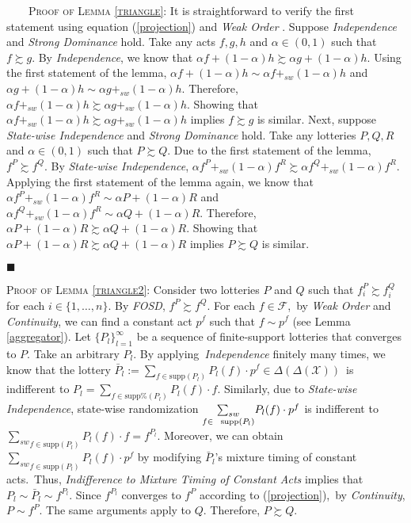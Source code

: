 \documentclass[12pt, notitlepage]{article}
\begin{document}
{~~~~\textsc{Proof of Lemma \ref{triangle}}: It is straightforward to verify
the first statement using equation (\ref{projection}) and \textit{Weak Order}%
. Suppose \textit{Independence} and \textit{Strong Dominance} hold. Take any
acts $f,g,h$ and $\alpha \in (0,1)$ such that $f\succsim g$. By \textit{%
Independence}, we know that $\alpha f+(1-\alpha )h\succsim \alpha
g+(1-\alpha )h$. Using the first statement of the lemma, $\alpha f+(1-\alpha
)h\sim \alpha f+_{sw}(1-\alpha )h$ and $\alpha g+(1-\alpha )h\sim \alpha
g+_{sw}(1-\alpha )h$. Therefore, $\alpha f+_{sw}(1-\alpha )h\succsim \alpha
g+_{sw}(1-\alpha )h$. Showing that $\alpha f+_{sw}(1-\alpha )h\succsim
\alpha g+_{sw}(1-\alpha )h$ implies $f\succsim g$ is similar. Next, suppose 
\textit{State-wise Independence} and \textit{Strong Dominance} hold. Take
any lotteries $P,Q,R$ and $\alpha \in (0,1)$ such that $P\succsim Q$. Due to
the first statement of the lemma, $f^{P}\succsim f^{Q}$. By \textit{%
State-wise Independence}, $\alpha f^{P}+_{sw}(1-\alpha )f^{R}\succsim \alpha
f^{Q}+_{sw}(1-\alpha )f^{R}$. Applying the first statement of the lemma
again, we know that $\alpha f^{P}+_{sw}(1-\alpha )f^{R}\sim \alpha
P+(1-\alpha )R$ and $\alpha f^{Q}+_{sw}(1-\alpha )f^{R}\sim \alpha
Q+(1-\alpha )R$. Therefore, $\alpha P+(1-\alpha )R\succsim \alpha
Q+(1-\alpha )R$. Showing that $\alpha P+(1-\alpha )R\succsim \alpha
Q+(1-\alpha )R$ implies $P\succsim Q$ is similar.}

\begin{flushleft}
{$\blacksquare $\linebreak }
\end{flushleft}

{\textsc{Proof of Lemma \ref{triangle2}}: Consider two lotteries $P$ and $Q$
such that $f_{i}^{P}\succsim f_{i}^{Q}$ for each $i\in \{1,\dots ,n\}$. By 
\textit{FOSD}, $f^{P}\succsim f^{Q}$. For each }$f\in \mathcal{F}$,{\ by 
\textit{Weak Order} and \textit{Continuity}, we can find a constant act $%
p^{f}$ such that $f\sim p^{f}$ (see Lemma \ref{aggregator}). Let }$%
\{P_{l}\}_{l=1}^{\infty }$ be a sequence of finite-support lotteries that
converges to $P$. Take an arbitrary $P_{l}$. By applying{\textit{\
Independence} finitely many times, we know that the lottery }$\bar{P}_{l}:=%
\underset{f\in \text{supp}(P_{l})}{\sum }P_{l}(f)\cdot p^{f}\in \Delta
(\Delta (\mathcal{X}))${\ is indifferent to }$P_{l}=\underset{f\in \text{supp%
}(P_{l})}{\sum }P_{l}(f)\cdot f${. Similarly, due to \textit{State-wise
Independence}, state-wise randomization $\underset{f\in \text{supp}(P_{l})}{%
\sum_{sw}}P_{l}(f)\cdot p^{f}$ is indifferent to }$\underset{f\in \text{supp}%
(P_{l})}{\sum_{sw}}P_{l}(f)\cdot f=f^{P_{l}}${. Moreover, we can obtain $%
\underset{f\in \text{supp}(P_{l})}{\sum_{sw}}P_{l}(f)\cdot p^{f}$ by}
modifying $\bar{P}_{l}$'s mixture timing of constant acts.{\ Thus, \textit{%
Indifference to Mixture Timing of Constant Acts} implies that }$P_{l}\sim 
\bar{P}_{l}\sim f^{P_{l}}${. Since} $f^{P_{l}}$ converges to $f^{P}$
according to (\ref{projection}),{\ by \textit{Continuity}}, $P\sim f^{P}$.
The same arguments apply to $Q$. Therefore, {$P\succsim Q$.}
\end{document}
